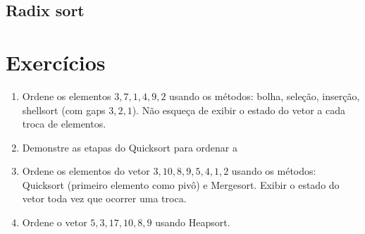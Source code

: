 \subsection{Radix sort}

\section{Exercícios}

\begin{enumerate}
\item Ordene os elementos $3, 7, 1, 4, 9, 2$ usando os métodos: bolha, seleção,
inserção, shellsort (com gaps $3, 2, 1$). Não esqueça de exibir o estado do vetor a cada troca
de elementos.

\item Demonstre as etapas do Quicksort para ordenar a 

\item Ordene os elementos do vetor $3, 10, 8, 9, 5, 4, 1, 2$ usando os métodos: 
Quicksort (primeiro elemento como pivô) e Mergesort. Exibir o estado do vetor toda vez que ocorrer 
uma troca.

\item Ordene o vetor $5, 3, 17, 10, 8, 9$ usando Heapsort.
\end{enumerate}
